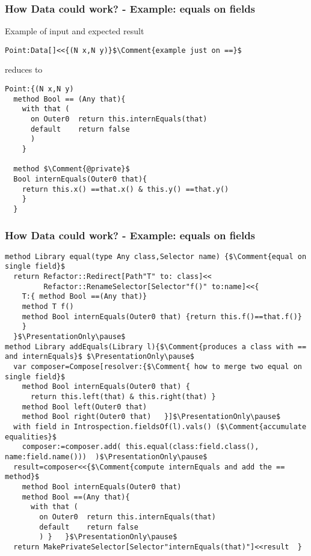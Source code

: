\begin{frame}[fragile]
\frametitle{How Data could work? - Example: equals on fields}
Example of input and expected result
\begin{NiceCode}{59ex}{0.76}
\begin{lstlisting}
Point:Data[]<<{(N x,N y)}$\Comment{example just on ==}$
\end{lstlisting}
\end{NiceCode}
reduces to
\begin{NiceCode}{59ex}{0.76}
\begin{lstlisting}
Point:{(N x,N y)
  method Bool == (Any that){
    with that (
      on Outer0  return this.internEquals(that) 
      default    return false 
      )
    }

  method $\Comment{@private}$
  Bool internEquals(Outer0 that){
    return this.x() ==that.x() & this.y() ==that.y()
    }
  }
\end{lstlisting}
\end{NiceCode}

\end{frame}


\begin{frame}[fragile]
\frametitle{How Data could work? - Example: equals on fields}
\begin{NiceCode}{59ex}{0.76}
\begin{lstlisting}
method Library equal(type Any class,Selector name) {$\Comment{equal on single field}$
  return Refactor::Redirect[Path"T" to: class]<<
         Refactor::RenameSelector[Selector"f()" to:name]<<{
    T:{ method Bool ==(Any that)}
    method T f()
    method Bool internEquals(Outer0 that) {return this.f()==that.f()}
    }  
  }$\PresentationOnly\pause$
method Library addEquals(Library l){$\Comment{produces a class with == and internEquals}$ $\PresentationOnly\pause$
  var composer=Compose[resolver:{$\Comment{ how to merge two equal on single field}$
    method Bool internEquals(Outer0 that) {
      return this.left(that) & this.right(that) }
    method Bool left(Outer0 that)
    method Bool right(Outer0 that)   }]$\PresentationOnly\pause$
  with field in Introspection.fieldsOf(l).vals() ($\Comment{accumulate equalities}$
    composer:=composer.add( this.equal(class:field.class(), name:field.name()))  )$\PresentationOnly\pause$
  result=composer<<{$\Comment{compute internEquals and add the == method}$
    method Bool internEquals(Outer0 that)
    method Bool ==(Any that){
      with that (
        on Outer0  return this.internEquals(that)
        default    return false
        ) }   }$\PresentationOnly\pause$
  return MakePrivateSelector[Selector"internEquals(that)"]<<result  }
\end{lstlisting}
\end{NiceCode}
\end{frame}


